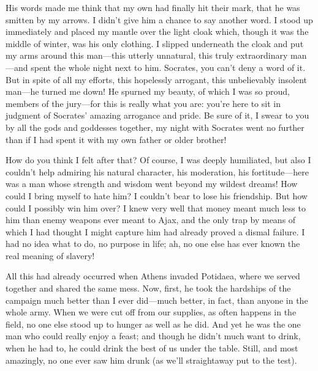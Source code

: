 His words made me think that my own had finally hit their mark, that he
was smitten by my arrows. I didn't give him a chance to say another
word. I stood up immediately and placed my mantle over the light cloak
which, though it was the middle of winter, was his only clothing. I
slipped underneath the cloak and put my arms around this man---this
utterly  unnatural, this truly extraordinary man---and spent the
whole night next to him. Socrates, you can't deny a word of it. But in
spite of all my efforts, this hopelessly arrogant, this unbelievably
insolent man---he turned me down! He spurned my beauty, of which I was
so proud, members of the jury---for this is really what you are: you're
here to sit in judgment of Socrates' amazing arrogance and pride. Be
sure of it, I swear to you by all the gods and goddesses together, my
night with Socrates went no  further than if I had spent it with
my own father or older brother!

How do you think I felt after that? Of course, I was deeply humiliated,
but also I couldn't help admiring his natural character, his moderation,
his fortitude---here was a man whose strength and wisdom went beyond my
wildest dreams! How could I bring myself to hate him? I couldn't bear to
lose his friendship. But how could I possibly win him over? I knew
 very well that money meant much less to him than enemy weapons
ever meant to Ajax,
and the only trap by means of which I had thought I might capture him
had already proved a dismal failure. I had no idea what to do, no
purpose in life; ah, no one else has ever known the real meaning of
slavery!

All this had already occurred when Athens invaded
Potidaea, where we
served together and shared the same mess. Now, first, he took the
hardships of the campaign much better than I ever did---much better, in
fact, than anyone in the whole army. When we were cut off from our
supplies, as often happens in the field, no one else stood up to hunger
as  well as he did. And yet he was the one man who could
really enjoy a feast; and though he didn't much want to drink, when he
had to, he could drink the best of us under the table. Still, and most
amazingly, no one ever saw him drunk (as we'll straightaway put to the
test).

